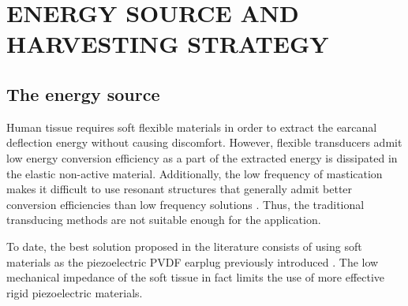 \documentclass[3p,twocolumn,preprint]{elsarticle}
\begin{document}
\section{ENERGY SOURCE AND HARVESTING STRATEGY}
\label{sec:THE ENERGY SOURCE AND HARVESTING STRATEGY}
	\subsection{The energy source}	
	\label{The energy source}
Human tissue requires soft flexible materials in order to extract the earcanal deflection energy without causing discomfort. However, flexible transducers admit low energy conversion efficiency as a part of the extracted energy is dissipated in the elastic non-active material. Additionally, the low frequency of mastication makes it difficult to use resonant structures that generally admit better conversion efficiencies than low frequency solutions \cite{Ashraf2011}. Thus, the traditional transducing methods are not suitable enough for the application.

To date, the best solution proposed in the literature consists of using soft materials as the piezoelectric PVDF earplug previously introduced \cite{Delnavaz2013}. The low mechanical impedance of the soft tissue in fact limits the use of more effective rigid piezoelectric materials.
\end{document}
